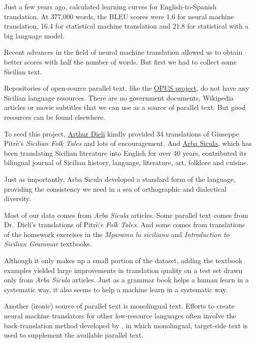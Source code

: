 \documentclass[10pt,letterpaper]{article}
\begin{document}
Just a few years ago, \citet{koehnknowles2017} calculated learning curves for
English-to-Spanish translation.  At 377,000 words, the BLEU scores
were 1.6 for neural machine translation, 16.4 for statistical machine
translation and 21.8 for statistical with a big language model.

Recent advances in the field of neural machine translation allowed us to obtain better scores
with half the number of words.  But first we had to collect some Sicilian text.

Repositories of open-source parallel text, like the \href{http://opus.nlpl.eu/}{OPUS project},
do not have any Sicilian language resources.  There are no government documents, Wikipedia articles or
movie subtitles that we can use as a source of parallel text. But good resources can be found elsewhere.

To seed this project, \href{http://www.dieli.net/}{Arthur Dieli} kindly provided
34 translations of Giuseppe Pitrè's \textit{Sicilian Folk Tales} and lots of encouragement.
And \href{http://www.arbasicula.org/}{Arba Sicula}, 
which has been translating Sicilian literature into English for over 40 years,
contributed its bilingual journal of Sicilian history, language, literature,
art, folklore and cuisine.

Just as importantly, Arba Sicula developed a standard form of the language,
providing the consistency we need in a sea of orthographic and dialectical diversity.

Most of our data comes from \textit{Arba Sicula} articles.
Some parallel text comes from Dr.~Dieli's translations of Pitrè's \textit{Folk Tales}.
And some comes from translations of the homework exercises in
the \textit{Mparamu lu sicilianu} \citep{cipolla2013} and 
\textit{Introduction to Sicilian Grammar} \citep{bonner2001} textbooks.

Although it only makes up a small portion of the dataset, adding the textbook examples
yielded large improvements in translation quality on a test set drawn only from
\textit{Arba Sicula} articles.  Just as a grammar book helps a human learn
in a systematic way, it also seems to help a machine learn in a systematic way.

Another (ironic) source of parallel text is monolingual text.
Efforts to create neural machine translators for other low-resource languages often
involve the back-translation method developed by \citet{sennrich2015backtrans},
in which monolingual, target-side text is used to supplement the available parallel text.
\end{document}
